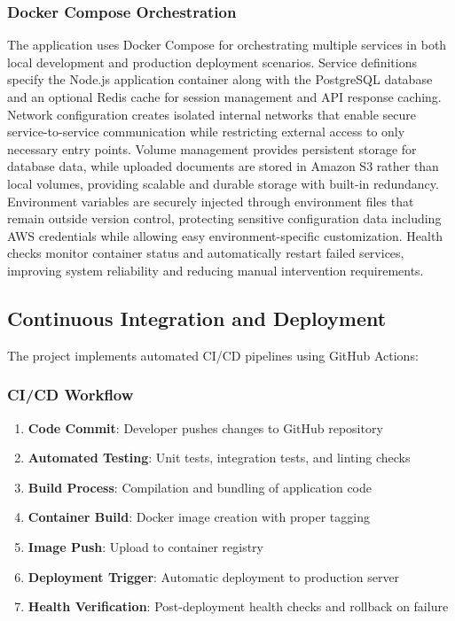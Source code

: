 \subsubsection{Docker Compose Orchestration}
The application uses Docker Compose for orchestrating multiple services in both local development and production deployment scenarios. Service definitions specify the Node.js application container along with the PostgreSQL database and an optional Redis cache for session management and API response caching. Network configuration creates isolated internal networks that enable secure service-to-service communication while restricting external access to only necessary entry points. Volume management provides persistent storage for database data, while uploaded documents are stored in Amazon S3 rather than local volumes, providing scalable and durable storage with built-in redundancy. Environment variables are securely injected through environment files that remain outside version control, protecting sensitive configuration data including AWS credentials while allowing easy environment-specific customization. Health checks monitor container status and automatically restart failed services, improving system reliability and reducing manual intervention requirements.

\subsection{Continuous Integration and Deployment}
The project implements automated CI/CD pipelines using GitHub Actions:

\subsubsection{CI/CD Workflow}
\begin{enumerate}
    \item \textbf{Code Commit}: Developer pushes changes to GitHub repository
    \item \textbf{Automated Testing}: Unit tests, integration tests, and linting checks
    \item \textbf{Build Process}: Compilation and bundling of application code
    \item \textbf{Container Build}: Docker image creation with proper tagging
    \item \textbf{Image Push}: Upload to container registry
    \item \textbf{Deployment Trigger}: Automatic deployment to production server
    \item \textbf{Health Verification}: Post-deployment health checks and rollback on failure
\end{enumerate}

